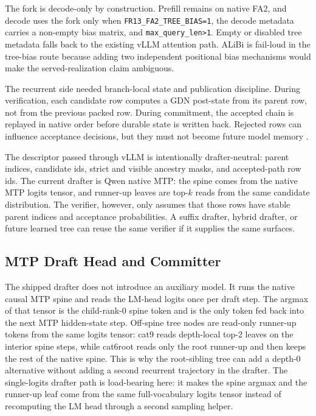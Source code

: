 \documentclass[conference]{IEEEtran}
\newcommand{\code}[1]{\texttt{#1}}
\begin{document}
The fork is decode-only by construction. Prefill remains on native FA2, and decode uses the fork only when \code{FR13\_FA2\_TREE\_BIAS=1}, the decode metadata carries a non-empty bias matrix, and \code{max\_query\_len>1}. Empty or disabled tree metadata falls back to the existing vLLM attention path. ALiBi is fail-loud in the tree-bias route because adding two independent positional bias mechanisms would make the served-realization claim ambiguous.

The recurrent side needed branch-local state and publication discipline. During verification, each candidate row computes a GDN post-state from its parent row, not from the previous packed row. During commitment, the accepted chain is replayed in native order before durable state is written back. Rejected rows can influence acceptance decisions, but they must not become future model memory \cite{sglang2026issue25587}.

The descriptor passed through vLLM is intentionally drafter-neutral: parent indices, candidate ids, strict and visible ancestry masks, and accepted-path row ids. The current drafter is Qwen native MTP: the spine comes from the native MTP logits tensor, and runner-up leaves are top-\(k\) reads from the same candidate distribution. The verifier, however, only assumes that those rows have stable parent indices and acceptance probabilities. A suffix drafter, hybrid drafter, or future learned tree can reuse the same verifier if it supplies the same surfaces.

\subsection{MTP Draft Head and Committer}

The shipped drafter does not introduce an auxiliary model. It runs the native causal MTP spine and reads the LM-head logits once per draft step. The argmax of that tensor is the child-rank-0 spine token and is the only token fed back into the next MTP hidden-state step. Off-spine tree nodes are read-only runner-up tokens from the same logits tensor: cat9 reads depth-local top-2 leaves on the interior spine steps, while cat6root reads only the root runner-up and then keeps the rest of the native spine. This is why the root-sibling tree can add a depth-0 alternative without adding a second recurrent trajectory in the drafter. The single-logits drafter path is load-bearing here: it makes the spine argmax and the runner-up leaf come from the same full-vocabulary logits tensor instead of recomputing the LM head through a second sampling helper.
\end{document}
